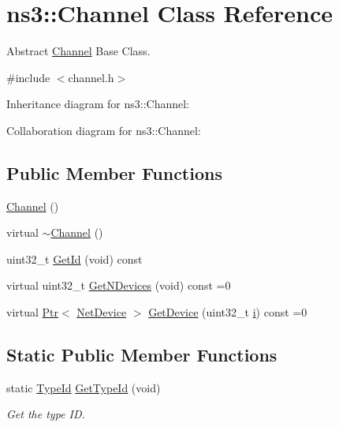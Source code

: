 \hypertarget{classns3_1_1Channel}{}\section{ns3\+:\+:Channel Class Reference}
\label{classns3_1_1Channel}


Abstract \hyperlink{classns3_1_1Channel}{Channel} Base Class.  




{\ttfamily \#include $<$channel.\+h$>$}



Inheritance diagram for ns3\+:\+:Channel\+:


Collaboration diagram for ns3\+:\+:Channel\+:
\subsection*{Public Member Functions}
\begin{DoxyCompactItemize}
\item 
\hyperlink{classns3_1_1Channel_a52285184d570dde461e3a03529f96bdc}{Channel} ()
\item 
virtual \hyperlink{classns3_1_1Channel_ae1d4efdf10e5238c580fed75a7a2b348}{$\sim$\+Channel} ()
\item 
uint32\+\_\+t \hyperlink{classns3_1_1Channel_a071225bc6683f16d7d114db51b8afba3}{Get\+Id} (void) const 
\item 
virtual uint32\+\_\+t \hyperlink{classns3_1_1Channel_ae9ff413402685d9952b4fbc4fa80d220}{Get\+N\+Devices} (void) const =0
\item 
virtual \hyperlink{classns3_1_1Ptr}{Ptr}$<$ \hyperlink{classns3_1_1NetDevice}{Net\+Device} $>$ \hyperlink{classns3_1_1Channel_a6644f4a9058be99c1a975ba415420b21}{Get\+Device} (uint32\+\_\+t \hyperlink{lte__uplink__power__control_8m_a6f6ccfcf58b31cb6412107d9d5281426}{i}) const =0
\end{DoxyCompactItemize}
\subsection*{Static Public Member Functions}
\begin{DoxyCompactItemize}
\item 
static \hyperlink{classns3_1_1TypeId}{Type\+Id} \hyperlink{classns3_1_1Channel_a1afdac6aa3dd416cbd6b4b8f42087dc8}{Get\+Type\+Id} (void)
\begin{DoxyCompactList}\small\item\em Get the type ID. \end{DoxyCompactList}\end{DoxyCompactItemize}
